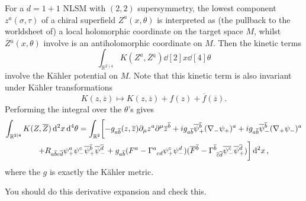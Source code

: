 For a $d = 1 + 1$ NLSM with $(2, 2)$ supersymmetry, the lowest component $z^a(\sigma, \tau)$ of a chiral superfield $Z^a(x, \theta)$ is interpreted as (the pullback to the worldsheet of) a local holomorphic coordinate on the target space $M$, whilst $\overline{Z}{}^{\overline{a}{}}(x, \theta)$ involve is an antiholomorphic coordinate on $M$. Then the kinetic terms
\begin{equation}
  \int_{\mathbb{R}^{2 \mid 4}} K(Z^a, \overline{Z}{}^{\overline{a}{}}) \dd[2]{x} \dd[4]{\theta}
\end{equation}
involve the Kähler potential on $M$. Note that this kinetic term is also invariant under Kähler transformations
\begin{equation}
  K(z, \overline{z}{}) \mapsto K(z, \overline{z}{}) + f(z) + \overline{f}{}(\overline{z}{}).
\end{equation}
Performing the integral over the $\theta$'s gives
\begin{multline}
  \int_{\mathbb{R}^{2 \mid 4}} K(Z, \overline{Z}{}) \dd[2]{x} \dd[4]{\theta} = \int_{\mathbb{R}^2} \biggl[ -g_{a \overline{b}{}} (z, \overline{z}{}) \partial_{\mu} z^{a} \partial^{\mu} \overline{z}{}^{\overline{b}{}} + i g_{a \overline{b}{}} \overline{\psi}{}_+^{\overline{b}{}} (\nabla_- \psi_+)^a + i g_{a \overline{b}{}} \overline{\psi}{}_-^{\overline{b}{}} (\nabla_+ \psi_-)^a 
\\ + R_{a \overline{b}{} c \overline{d}{}} \psi^a_+ \psi^c_- \overline{\psi}{}^{\overline{b}{}}_+ \overline{\psi}{}_-^{\overline{d}{}} + g_{a \overline{b}{}} (F^a - \Gamma\indices{^{a}_{cd}} \psi^{c}_+ \psi^{d}_-)(\overline{F}{}^{\overline{b}{}} - \Gamma\indices{^{\overline{b}{}}_{\overline{c}{} \overline{d}{}}} \overline{\psi}{}^{\overline{c}{}}_- \overline{\psi}{}^{\overline{d}{}}_+) \biggr] \dd[2]{x},
\end{multline}
where the $g$ is exactly the Kähler metric.
\begin{exercise}
  You should do this derivative expansion and check this.
\end{exercise}
